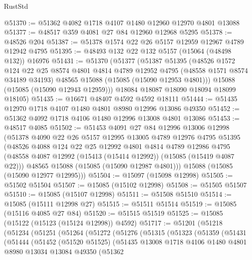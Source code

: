 \begin{lexlean}{RustStd}
\begin{coremodule}
@51370 := @51362 @4082 @1718 @4107 @1480 @12960 @12970 @4801 @13088
@51377 := @48517 @359 @4081 @27 @84 @12960 @12968 @5295
@51378 := @48526 @204
@51387 := @51378 @1574 @22 @26 @5157 @12959 @12967 @4789 @12942 @4795
@51395 := @48493 @132 @22 @132 @5157 (@15064 (@48498 @132)) @16976
@51431 := @51370
    (@51377
      (@51387
        @51395
        (@48526
          @1572
          @124
          @22
          @25
          @8574
          @4801
          @4814
          @4789
          @12952
          @4795
          (@48558 @1571 @8574 @34189 @34193)
          @48565
          @15088
          (@15085 (@15090 @12953 @4801)))
        @15088
        (@15085 (@15090 @12943 @12959)))
      @18084
      @18087
      @18090
      @18094
      @18099
      @18105)
@51435 := @16671 @48407 @4592 @4592 @18111
@51444 := @51435 @12970 @1718 @4107 @1480 @4801 @8980 @12996 @13086 @49350
@51452 := @51362 @4092 @1718 @4106 @1480 @12996 @13008 @4801 @13086
@51453 := @48517 @4085
@51502 := @51453
    @4091
    @27
    @84
    @12996
    @13006
    @12998
    (@51378
      @4090
      @22
      @26
      @5157
      @12995
      @13005
      @4789
      @12976
      @4795
      @51395
      (@48526
        @4088
        @124
        @22
        @25
        @12992
        @4801
        @4814
        @4789
        @12986
        @4795
        (@48558 @4087 @12992 (@15413 (@15414 @12992)) (@15085 (@15419 @4087 @22)))
        @48565
        @15088
        (@15085 (@15090 @12987 @4801)))
      @15088
      (@15085 (@15090 @12977 @12995)))
@51504 := @15097 (@15098 @12998)
@51505 := @51502 @51504
@51507 := @15085 (@15102 @12998)
@51508 := @51505 @51507
@51510 := @15085 (@15107 @12998)
@51511 := @51508 @51510
@51514 := @15085 (@15111 @12998 @27)
@51515 := @51511 @51514
@51519 := @15085 (@15116 @4085 @27 @84)
@51520 := @51515 @51519
@51525 := @15085 (@15122 (@15123 (@15124 @12998)) @4592)
@51717 := @51201
    (@51218
      (@51234
        (@51251
          (@51264
            (@51272
              (@51276
                (@51315
                  (@51323
                    (@51359
                      (@51431
                        (@51444
                          (@51452
                            (@51520 @51525)
                            (@51435
                              @13008
                              @1718
                              @4106
                              @1480
                              @4801
                              @8980
                              @13034
                              @13084
                              @49350
                              (@51362

\end{coremodule}
\end{lexlean}
